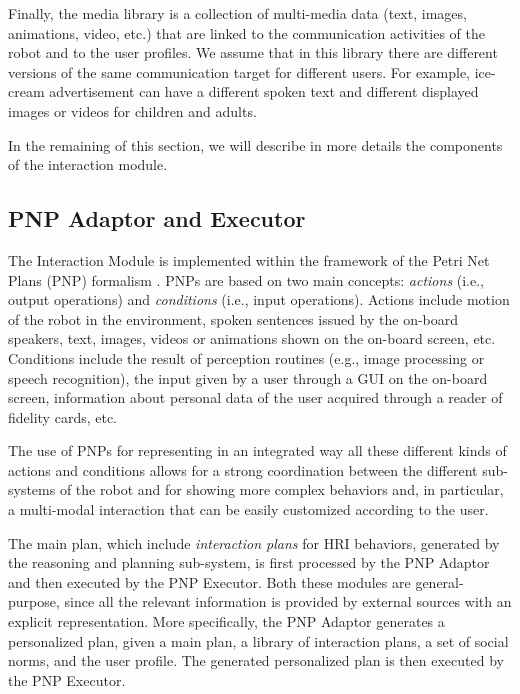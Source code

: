 Finally, the media library is a collection of multi-media data (text, images, animations, video, etc.) that are linked to the communication activities of the robot and to the user profiles. We assume that in this library there are different versions of the same communication target for different users. For example, ice-cream advertisement can have a different spoken text and different displayed images or videos for children and adults.

In the remaining of this section, we will describe in more details the components of the interaction module.

\subsection{PNP Adaptor and Executor}

The Interaction Module is implemented within the framework of the Petri Net Plans (PNP) formalism \cite{ziparo2011petri}. PNPs are based on two main concepts: \emph{actions} (i.e., output operations) and \emph{conditions} (i.e., input operations). Actions include motion of the robot in the environment, spoken sentences issued by the on-board speakers, text, images, videos or animations shown on the on-board screen, etc.
Conditions include the result of perception routines (e.g., image processing or speech recognition), the input given by a user through a GUI on the on-board screen, information about personal data of the user acquired through a reader of fidelity cards, etc.

The use of PNPs for representing in an integrated way all these different kinds of actions and conditions allows for a strong coordination between the different sub-systems of the robot and for showing more complex behaviors and, in particular, a multi-modal interaction that can be easily customized according to the user.


The main plan, which include \emph{interaction plans} for HRI behaviors, generated by the reasoning and planning sub-system, is first processed by the PNP Adaptor and then executed by the PNP Executor. Both these modules are general-purpose, since all the relevant information is provided by external sources with an explicit representation. More specifically, the PNP Adaptor generates a personalized plan, given a main plan, a library of interaction plans, a set of social norms, and the user profile. The generated personalized plan is then executed by the PNP Executor. 

